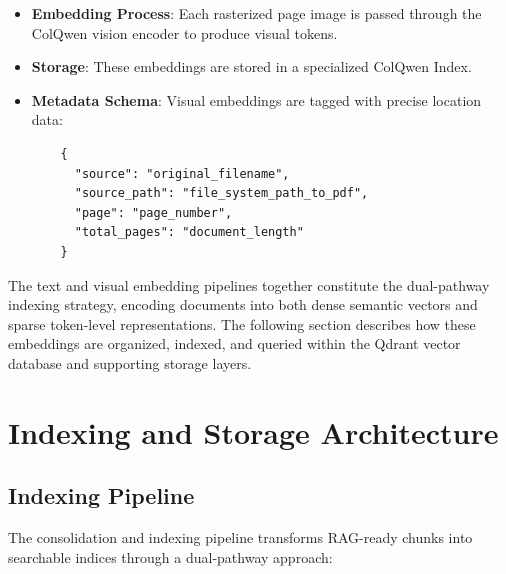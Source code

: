\begin{itemize}
    \item \textbf{Embedding Process}: Each rasterized page image is passed through the ColQwen vision encoder to produce visual tokens.
    \item \textbf{Storage}: These embeddings are stored in a specialized ColQwen Index.
    \item \textbf{Metadata Schema}: Visual embeddings are tagged with precise location data:
    \begin{verbatim}
    {
      "source": "original_filename",
      "source_path": "file_system_path_to_pdf",
      "page": "page_number",
      "total_pages": "document_length"
    }
    \end{verbatim}
\end{itemize}

The text and visual embedding pipelines together constitute the dual-pathway indexing strategy, encoding documents into both dense semantic vectors and sparse token-level representations. The following section describes how these embeddings are organized, indexed, and queried within the Qdrant vector database and supporting storage layers.

\section{Indexing and Storage Architecture}

\subsection{Indexing Pipeline}

The consolidation and indexing pipeline transforms RAG-ready chunks into searchable indices through a dual-pathway approach:

\begin{table}[H]
\centering
\caption[Indexing Output Artifacts]{Artifacts produced by the indexing pipeline for each document.}
\label{tab:indexing_artifacts}
\end{table}

